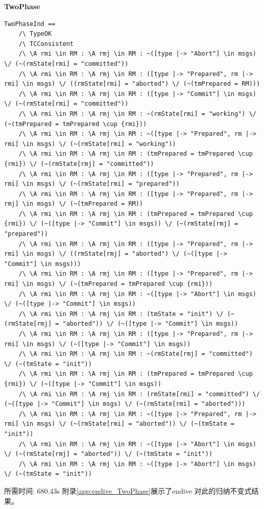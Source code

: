 \textbf{TwoPhase}
\begin{lstlisting}
TwoPhaseInd ==
    /\ TypeOK
    /\ TCConsistent
    /\ \A rmi \in RM : \A rmj \in RM : ~([type |-> "Abort"] \in msgs) \/ (~(rmState[rmi] = "committed"))
    /\ \A rmi \in RM : \A rmj \in RM : ([type |-> "Prepared", rm |-> rmi] \in msgs) \/ ((rmState[rmi] = "aborted") \/ (~(tmPrepared = RM)))
    /\ \A rmi \in RM : \A rmj \in RM : ([type |-> "Commit"] \in msgs) \/ (~(rmState[rmi] = "committed"))
    /\ \A rmi \in RM : \A rmj \in RM : ~(rmState[rmi] = "working") \/ (~(tmPrepared = tmPrepared \cup {rmi}))
    /\ \A rmi \in RM : \A rmj \in RM : ~([type |-> "Prepared", rm |-> rmi] \in msgs) \/ (~(rmState[rmi] = "working"))
    /\ \A rmi \in RM : \A rmj \in RM : (tmPrepared = tmPrepared \cup {rmi}) \/ (~(rmState[rmj] = "committed"))
    /\ \A rmi \in RM : \A rmj \in RM : ([type |-> "Prepared", rm |-> rmi] \in msgs) \/ (~(rmState[rmi] = "prepared"))
    /\ \A rmi \in RM : \A rmj \in RM : ([type |-> "Prepared", rm |-> rmj] \in msgs) \/ (~(tmPrepared = RM))
    /\ \A rmi \in RM : \A rmj \in RM : (tmPrepared = tmPrepared \cup {rmi}) \/ (~([type |-> "Commit"] \in msgs)) \/ (~(rmState[rmj] = "prepared"))
    /\ \A rmi \in RM : \A rmj \in RM : ([type |-> "Prepared", rm |-> rmi] \in msgs) \/ ((rmState[rmj] = "aborted") \/ (~([type |-> "Commit"] \in msgs)))
    /\ \A rmi \in RM : \A rmj \in RM : ([type |-> "Prepared", rm |-> rmi] \in msgs) \/ (~(tmPrepared = tmPrepared \cup {rmi}))
    /\ \A rmi \in RM : \A rmj \in RM : ~([type |-> "Abort"] \in msgs) \/ (~([type |-> "Commit"] \in msgs))
    /\ \A rmi \in RM : \A rmj \in RM : (tmState = "init") \/ (~(rmState[rmj] = "aborted")) \/ (~([type |-> "Commit"] \in msgs))
    /\ \A rmi \in RM : \A rmj \in RM : ([type |-> "Prepared", rm |-> rmi] \in msgs) \/ (~([type |-> "Commit"] \in msgs))
    /\ \A rmi \in RM : \A rmj \in RM : ~(rmState[rmj] = "committed") \/ (~(tmState = "init"))
    /\ \A rmi \in RM : \A rmj \in RM : (tmPrepared = tmPrepared \cup {rmi}) \/ (~([type |-> "Commit"] \in msgs))
    /\ \A rmi \in RM : \A rmj \in RM : (rmState[rmi] = "committed") \/ (~([type |-> "Commit"] \in msgs) \/ (~(rmState[rmi] = "aborted")))
    /\ \A rmi \in RM : \A rmj \in RM : ~([type |-> "Prepared", rm |-> rmi] \in msgs) \/ (~(rmState[rmi] = "aborted")) \/ (~(tmState = "init"))
    /\ \A rmi \in RM : \A rmj \in RM : ~([type |-> "Abort"] \in msgs) \/ (~(rmState[rmj] = "aborted")) \/ (~(tmState = "init"))
    /\ \A rmi \in RM : \A rmj \in RM : ~([type |-> "Abort"] \in msgs) \/ (~(tmState = "init"))
\end{lstlisting}
所需时间: 680.43s 
附录\ref{app:endive_TwoPhase}展示了endive 对此的归纳不变式结果。

